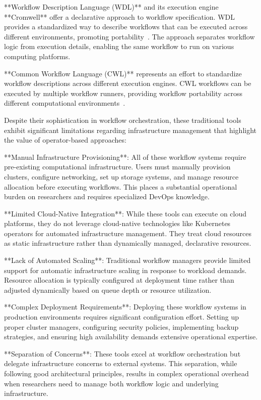 **Workflow Description Language (WDL)** and its execution engine **Cromwell** offer a declarative approach to workflow specification.
WDL provides a standardized way to describe workflows that can be executed across different environments, promoting portability~\cite{wdl_cromwell}.
The approach separates workflow logic from execution details, enabling the same workflow to run on various computing platforms.

**Common Workflow Language (CWL)** represents an effort to standardize workflow descriptions across different execution engines.
CWL workflows can be executed by multiple workflow runners, providing workflow portability across different computational environments~\cite{cwl}.

Despite their sophistication in workflow orchestration, these traditional tools exhibit significant limitations regarding infrastructure management that highlight the value of operator-based approaches:

**Manual Infrastructure Provisioning**: All of these workflow systems require pre-existing computational infrastructure.
Users must manually provision clusters, configure networking, set up storage systems, and manage resource allocation before executing workflows.
This places a substantial operational burden on researchers and requires specialized DevOps knowledge.

**Limited Cloud-Native Integration**: While these tools can execute on cloud platforms, they do not leverage cloud-native technologies like Kubernetes operators for automated infrastructure management.
They treat cloud resources as static infrastructure rather than dynamically managed, declarative resources.

**Lack of Automated Scaling**: Traditional workflow managers provide limited support for automatic infrastructure scaling in response to workload demands.
Resource allocation is typically configured at deployment time rather than adjusted dynamically based on queue depth or resource utilization.

**Complex Deployment Requirements**: Deploying these workflow systems in production environments requires significant configuration effort.
Setting up proper cluster managers, configuring security policies, implementing backup strategies, and ensuring high availability demands extensive operational expertise.

**Separation of Concerns**: These tools excel at workflow orchestration but delegate infrastructure concerns to external systems.
This separation, while following good architectural principles, results in complex operational overhead when researchers need to manage both workflow logic and underlying infrastructure.

